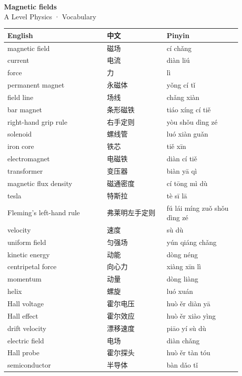 \documentclass[11pt]{article}
\begin{document}
\begin{center}
  {\LARGE\bfseries Magnetic fields}\\[0.35em]
  {\large A Level Physics · Vocabulary}
\end{center}
\vspace{0.6em}

\begin{longtable}{@{}p{0.40\linewidth}p{0.24\linewidth}p{0.30\linewidth}@{}}
\toprule
\textbf{English} & \textbf{中文} & \textbf{Pinyin} \\
\midrule
\endhead
\bottomrule
\endlastfoot
magnetic field & 磁场 & cí chǎng \\
current & 电流 & diàn liú \\
force & 力 & lì \\
permanent magnet & 永磁体 & yǒng cí tǐ \\
field line & 场线 & chǎng xiàn \\
bar magnet & 条形磁铁 & tiáo xíng cí tiě \\
right-hand grip rule & 右手定则 & yòu shǒu dìng zé \\
solenoid & 螺线管 & luó xiàn guǎn \\
iron core & 铁芯 & tiě xīn \\
electromagnet & 电磁铁 & diàn cí tiě \\
transformer & 变压器 & biàn yā qì \\
magnetic flux density & 磁通密度 & cí tōng mì dù \\
tesla & 特斯拉 & tè sī lā \\
Fleming's left-hand rule & 弗莱明左手定则 & fú lái míng zuǒ shǒu dìng zé \\
velocity & 速度 & sù dù \\
uniform field & 匀强场 & yún qiáng chǎng \\
kinetic energy & 动能 & dòng néng \\
centripetal force & 向心力 & xiàng xīn lì \\
momentum & 动量 & dòng liàng \\
helix & 螺旋 & luó xuán \\
Hall voltage & 霍尔电压 & huò ěr diàn yā \\
Hall effect & 霍尔效应 & huò ěr xiào yìng \\
drift velocity & 漂移速度 & piāo yí sù dù \\
electric field & 电场 & diàn chǎng \\
Hall probe & 霍尔探头 & huò ěr tàn tóu \\
semiconductor & 半导体 & bàn dǎo tǐ \\

\end{longtable}
\end{document}
